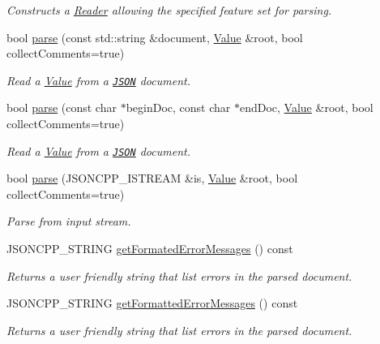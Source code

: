 \begin{DoxyCompactItemize}
\begin{DoxyCompactList}\small\item\em Constructs a \hyperlink{classJson_1_1Reader}{Reader} allowing the specified feature set for parsing. \end{DoxyCompactList}\item 
bool \hyperlink{classJson_1_1Reader_af1da6c976ad1e96c742804c3853eef94}{parse} (const std\+::string \&document, \hyperlink{classJson_1_1Value}{Value} \&root, bool collect\+Comments=true)
\begin{DoxyCompactList}\small\item\em Read a \hyperlink{classJson_1_1Value}{Value} from a \href{http://www.json.org}{\tt J\+S\+ON} document. \end{DoxyCompactList}\item 
bool \hyperlink{classJson_1_1Reader_ac71ef2b64c7c27b062052e692af3fb32}{parse} (const char $\ast$begin\+Doc, const char $\ast$end\+Doc, \hyperlink{classJson_1_1Value}{Value} \&root, bool collect\+Comments=true)
\begin{DoxyCompactList}\small\item\em Read a \hyperlink{classJson_1_1Value}{Value} from a \href{http://www.json.org}{\tt J\+S\+ON} document. \end{DoxyCompactList}\item 
bool \hyperlink{classJson_1_1Reader_a6d5d0e23f68749d2f17feece4ccf504d}{parse} (J\+S\+O\+N\+C\+P\+P\+\_\+\+I\+S\+T\+R\+E\+AM \&is, \hyperlink{classJson_1_1Value}{Value} \&root, bool collect\+Comments=true)
\begin{DoxyCompactList}\small\item\em Parse from input stream. \end{DoxyCompactList}\item 
J\+S\+O\+N\+C\+P\+P\+\_\+\+S\+T\+R\+I\+NG \hyperlink{classJson_1_1Reader_a791cbc5afd1bef1631e07239dc452c79}{get\+Formated\+Error\+Messages} () const
\begin{DoxyCompactList}\small\item\em Returns a user friendly string that list errors in the parsed document. \end{DoxyCompactList}\item 
J\+S\+O\+N\+C\+P\+P\+\_\+\+S\+T\+R\+I\+NG \hyperlink{classJson_1_1Reader_ae638a7b1f36f7ccf99ba89fa36ccf222}{get\+Formatted\+Error\+Messages} () const
\begin{DoxyCompactList}\small\item\em Returns a user friendly string that list errors in the parsed document. \end{DoxyCompactList}\item 

\end{DoxyCompactItemize}

